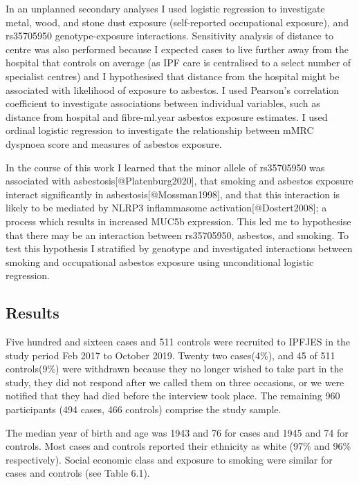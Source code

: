 In an unplanned secondary analyses I used logistic regression to
investigate metal, wood, and stone dust exposure (self-reported
occupational exposure), and rs35705950 genotype-exposure interactions.
Sensitivity analysis of distance to centre was also performed because I
expected cases to live further away from the hospital that controls on
average (as IPF care is centralised to a select number of specialist
centres) and I hypothesised that distance from the hospital might be
associated with likelihood of exposure to asbestos. I used Pearson's
correlation coefficient to investigate associations between individual
variables, such as distance from hospital and fibre-ml.year asbestos
exposure estimates. I used ordinal logistic regression to investigate
the relationship between mMRC dyspnoea score and measures of asbestos
exposure.

In the course of this work I learned that the minor allele of rs35705950
was associated with asbestosis{[}@Platenburg2020{]}, that smoking and
asbestos exposure interact significantly in
asbestosis{[}@Mossman1998{]}, and that this interaction is likely to be
mediated by NLRP3 inflammasome activation{[}@Dostert2008{]}; a process
which results in increased MUC5b expression. This led me to hypothesise
that there may be an interaction between rs35705950, asbestos, and
smoking. To test this hypothesis I stratified by genotype and
investigated interactions between smoking and occupational asbestos
exposure using unconditional logistic regression.

\hypertarget{results}{%
\subsection{Results}\label{results}}

Five hundred and sixteen cases and 511 controls were recruited to IPFJES
in the study period Feb 2017 to October 2019. Twenty two cases(4\%), and
45 of 511 controls(9\%) were withdrawn because they no longer wished to
take part in the study, they did not respond after we called them on
three occasions, or we were notified that they had died before the
interview took place. The remaining 960 participants (494 cases, 466
controls) comprise the study sample.

The median year of birth and age was 1943 and 76 for cases and 1945 and
74 for controls. Most cases and controls reported their ethnicity as
white (97\% and 96\% respectively). Social economic class and exposure
to smoking were similar for cases and controls (see Table 6.1).

